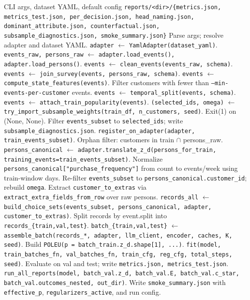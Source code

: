 \documentclass[11pt,a4paper]{article}
\begin{document}
\begin{algorithm}[H]
\caption{Driver pipeline (21 stages)}
\begin{algorithmic}[1]
\Require CLI args, dataset YAML, default config
\Ensure \texttt{reports/<dir>/\{metrics.json, metrics\_test.json, per\_decision.json, head\_naming.json, dominant\_attribute.json, counterfactual.json, subsample\_diagnostics.json, smoke\_summary.json\}}
\State Parse args; resolve adapter and dataset YAML.
\State \texttt{adapter} $\gets$ \texttt{YamlAdapter(dataset\_yaml)}.
\State \texttt{events\_raw, persons\_raw} $\gets$ \texttt{adapter.load\_events(), adapter.load\_persons()}.
\State \texttt{events} $\gets$ \texttt{clean\_events(events\_raw, schema)}.
\State \texttt{events} $\gets$ \texttt{join\_survey(events, persons\_raw, schema)}.
\State \texttt{events} $\gets$ \texttt{compute\_state\_features(events)}.
\State Filter customers with fewer than \texttt{--min-events-per-customer} events.
\State \texttt{events} $\gets$ \texttt{temporal\_split(events, schema)}.
\State \texttt{events} $\gets$ \texttt{attach\_train\_popularity(events)}.
\State \texttt{(selected\_ids, omega)} $\gets$ \texttt{try\_import\_subsample\_weights(train\_df, n\_customers, seed)}. Exit(1) on (None, None).
\State Filter \texttt{events\_subset} to \texttt{selected\_ids}; write \texttt{subsample\_diagnostics.json}.
\State \texttt{register\_on\_adapter(adapter, train\_events\_subset)}.
\State Orphan filter: customers in train $\cap$ persons\_raw.
\State \texttt{persons\_canonical} $\gets$ \texttt{adapter.translate\_z\_d(persons\_for\_train, training\_events=train\_events\_subset)}.
\State Normalize \texttt{persons\_canonical["purchase\_frequency"]} from count to events/week using train-window days.
\State Re-filter \texttt{events\_subset} to \texttt{persons\_canonical.customer\_id}; rebuild \texttt{omega}.
\State Extract \texttt{customer\_to\_extras} via \texttt{extract\_extra\_fields\_from\_row} over raw persons.
\State \texttt{records\_all} $\gets$ \texttt{build\_choice\_sets(events\_subset, persons\_canonical, adapter, customer\_to\_extras)}.
\State Split records by event.split into \texttt{records\_\{train,val,test\}}.
\State \texttt{batch\_\{train,val,test\}} $\gets$ \texttt{assemble\_batch(records\_*, adapter, llm\_client, encoder, caches, K, seed)}.
\State Build \texttt{POLEU(p = batch\_train.z\_d.shape[1], ...)}.
\State \texttt{fit(model, train\_batches\_fn, val\_batches\_fn, train\_cfg, reg\_cfg, total\_steps, seed)}.
\State Evaluate on val and test; write \texttt{metrics.json, metrics\_test.json}.
\State \texttt{run\_all\_reports(model, batch\_val.z\_d, batch\_val.E, batch\_val.c\_star, batch\_val.outcomes\_nested, out\_dir)}.
\State Write \texttt{smoke\_summary.json} with \texttt{effective\_p}, \texttt{regularizers\_active}, and run config.
\end{algorithmic}
\end{algorithm}
\end{document}
